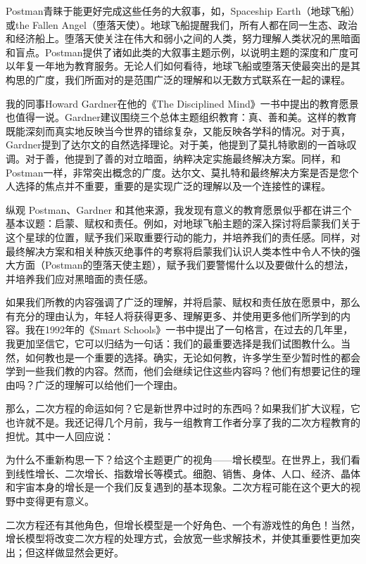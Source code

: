 Postman青睐于能更好完成这些任务的大叙事，如，Spaceship Earth（地球飞船）或the Fallen Angel（堕落天使）。地球飞船提醒我们，所有人都在同一生态、政治和经济船上。堕落天使关注在伟大和弱小之间的人类，努力理解人类状况的黑暗面和盲点。Postman提供了诸如此类的大叙事主题示例，以说明主题的深度和广度可以年复一年地为教育服务。无论人们如何看待，地球飞船或堕落天使最突出的是其构思的广度，我们所面对的是范围广泛的理解和以无数方式联系在一起的课程。

我的同事Howard Gardner在他的《The Disciplined Mind》一书中提出的教育愿景也值得一说。Gardner建议围绕三个总体主题组织教育：真、善和美。这样的教育既能深刻而真实地反映当今世界的错综复杂，又能反映各学科的情况。对于真，Gardner提到了达尔文的自然选择理论。对于美，他提到了莫扎特歌剧的一首咏叹调。对于善，他提到了善的对立暗面，纳粹决定实施最终解决方案。同样，和Postman一样，非常突出概念的广度。达尔文、莫扎特和最终解决方案是否是您个人选择的焦点并不重要，重要的是实现广泛的理解以及一个连接性的课程。

纵观 Postman、Gardner 和其他来源，我发现有意义的教育愿景似乎都在讲三个基本议题：启蒙、赋权和责任。例如，对地球飞船主题的深入探讨将启蒙我们关于这个星球的位置，赋予我们采取重要行动的能力，并培养我们的责任感。同样，对最终解决方案和相关种族灭绝事件的考察将启蒙我们认识人类本性中令人不快的强大方面（Postman的堕落天使主题），赋予我们要警惕什么以及要做什么的想法，并培养我们应对黑暗面的责任感。

如果我们所教的内容强调了广泛的理解，并将启蒙、赋权和责任放在愿景中，那么有充分的理由认为，年轻人将获得更多、理解更多、并使用更多他们所学到的内容。我在1992年的《Smart Schools》一书中提出了一句格言，在过去的几年里，我更加坚信它，它可以归结为一句话：我们的最重要选择是我们试图教什么。当然，如何教也是一个重要的选择。确实，无论如何教，许多学生至少暂时性的都会学到一些我们教的内容。然而，他们会继续记住这些内容吗？他们有想要记住的理由吗？广泛的理解可以给他们一个理由。

那么，二次方程的命运如何？它是新世界中过时的东西吗？如果我们扩大议程，它也许就不是。我还记得几个月前，我与一组教育工作者分享了我的二次方程教育的担忧。其中一人回应说：

为什么不重新构思一下？给这个主题更广的视角——增长模型。在世界上，我们看到线性增长、二次增长、指数增长等模式。细胞、销售、身体、人口、经济、晶体和宇宙本身的增长是一个我们反复遇到的基本现象。二次方程可能在这个更大的视野中变得更有意义。

二次方程还有其他角色，但增长模型是一个好角色、一个有游戏性的角色！当然，增长模型将改变二次方程的处理方式，会放宽一些求解技术，并使其重要性更加突出；但这样做显然会更好。

